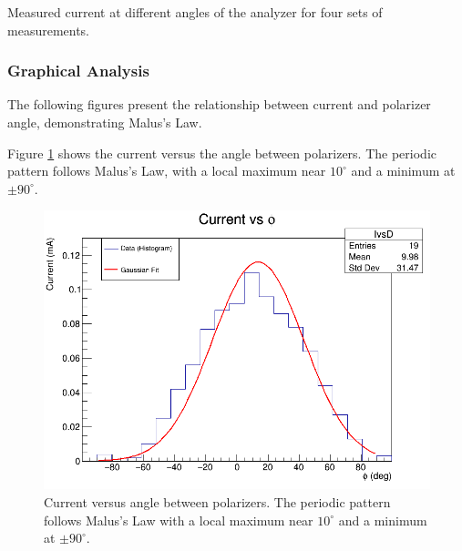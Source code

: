 \documentclass[journal]{IEEEtran}
\begin{document}
\begin{table}[H]
    \centering
    \caption{Measured current at different angles of the analyzer for four sets of measurements.}
    \label{tab:intensity_measurements}
\end{table}

\subsubsection{Graphical Analysis}
The following figures present the relationship between current and polarizer angle, demonstrating Malus's Law.

Figure \ref{fig:current_vs_angle} shows the current versus the angle between polarizers. The periodic pattern follows Malus's Law, with a local maximum near $10^\circ$ and a minimum at $\pm 90^\circ$.

\begin{figure}[H]
    \centering
    \includegraphics[width=\linewidth]{../plots/I_vs_D.png}
    \caption{Current versus angle between polarizers. The periodic pattern follows Malus's Law with a local maximum near $10^\circ$ and a minimum at $\pm 90^\circ$.}
    \label{fig:current_vs_angle}
\end{figure}
\end{document}
